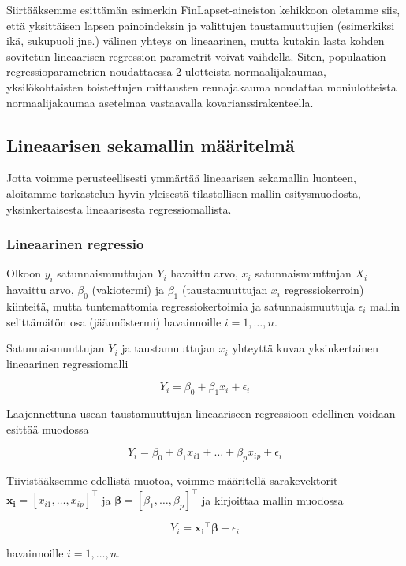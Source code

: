 \documentclass[finnish]{docopts}
\begin{document}
Siirtääksemme \cite{laird82} esittämän esimerkin FinLapset-aineiston kehikkoon oletamme siis, että yksittäisen lapsen painoindeksin ja valittujen taustamuuttujien (esimerkiksi ikä, sukupuoli jne.) välinen yhteys on lineaarinen, mutta kutakin lasta kohden sovitetun lineaarisen regression parametrit voivat vaihdella. Siten, populaation regressioparametrien noudattaessa 2-ulotteista normaalijakaumaa, yksilökohtaisten toistettujen mittausten reunajakauma noudattaa moniulotteista normaalijakaumaa asetelmaa vastaavalla kovarianssirakenteella. 

\subsection{Lineaarisen sekamallin määritelmä}
\label{sub:lsmmaar}

Jotta voimme perusteellisesti ymmärtää lineaarisen sekamallin luonteen, aloitamme tarkastelun hyvin yleisestä tilastollisen mallin esitysmuodosta, yksinkertaisesta lineaarisesta regressiomallista.

\subsubsection{Lineaarinen regressio}
\label{ssb:linreg}

Olkoon $y_i$ satunnaismuuttujan $Y_i$ havaittu arvo, $x_i$ satunnaismuuttujan $X_i$ havaittu arvo, $\beta_0$ (vakiotermi) ja $\beta_1$ (taustamuuttujan $x_i$ regressiokerroin) kiinteitä, mutta tuntemattomia regressiokertoimia ja satunnaismuuttuja $\epsilon_i$ mallin selittämätön osa (jäännöstermi) havainnoille $i = 1,\dots,n$.

Satunnaismuuttujan $Y_i$ ja taustamuuttujan $x_i$ yhteyttä kuvaa yksinkertainen lineaarinen regressiomalli

$$
Y_i = \beta_0 + \beta_1 x_i + \epsilon_i
$$

Laajennettuna usean taustamuuttujan lineaariseen regressioon edellinen voidaan esittää muodossa

$$
Y_i = \beta_0 + \beta_1 x_{i1} + \dots + \beta_p x_{ip} + \epsilon_i
$$

Tiivistääksemme edellistä muotoa, voimme määritellä sarakevektorit $\bm{x_i} = [x_{i1} , \dots, x_{ip}]^\top$ ja $\bm{\beta} = [\beta_1 , \dots, \beta_{p}]^\top$ ja kirjoittaa mallin muodossa

$$
Y_i = \bm{x_i}^\top \bm{\beta} + \epsilon_i
$$

havainnoille $i = 1,\dots,n$. \\
\end{document}
